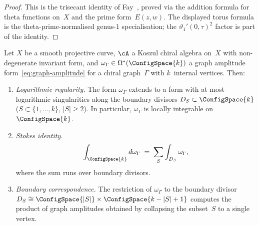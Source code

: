\begin{proof}
This is the trisecant identity of Fay~\cite[Corollary~2.5]{Fay73},
proved via the addition formula for theta functions on~$X$ and
the prime form~$E(z,w)$. The displayed torus formula is the
theta-prime-normalised genus-$1$ specialisation; the
$\vartheta_1'(0,\tau)^2$ factor is part of the identity.
\end{proof}

\begin{proposition}\label{prop:stokes-regularity-FM}
Let $X$ be a smooth projective curve, $\cA$ a Koszul chiral algebra
on~$X$ with non-degenerate invariant form, and
$\omega_\Gamma \in \Omega^*(\ConfigSpace{k})$
a graph amplitude form~\eqref{eq:graph-amplitude} for a chiral
graph~$\Gamma$ with $k$~internal vertices. Then:
\begin{enumerate}[label=\textup{(\alph*)}]
\item \emph{Logarithmic regularity.}
 The form $\omega_\Gamma$ extends to a form with at most logarithmic
 singularities along the boundary divisors $D_S \subset
 \ConfigSpace{k}$
 \textup{(}$S \subset \{1,\ldots,k\}$, $|S|\geq 2$\textup{)}.
 In particular, $\omega_\Gamma$ is locally integrable on
 $\ConfigSpace{k}$.
\item \emph{Stokes identity.}
 \begin{equation}\label{eq:stokes-FM}
 \int_{\ConfigSpace{k}} d\omega_\Gamma
 \;=\;
 \sum_{S} \int_{D_S} \omega_\Gamma,
 \end{equation}
 where the sum runs over boundary divisors.
\item \emph{Boundary correspondence.}
 The restriction of $\omega_\Gamma$ to the boundary divisor
 $D_S \cong \ConfigSpace{|S|} \times \ConfigSpace{k-|S|+1}$
 computes the product of graph amplitudes obtained by collapsing
 the subset~$S$ to a single vertex.
\end{enumerate}
\end{proposition}

